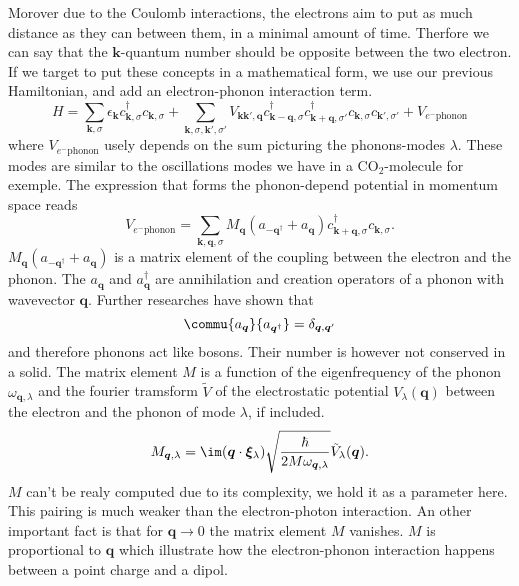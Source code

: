 \documentclass[../main.tex]{subfile}
\begin{document}
Morover due to the Coulomb interactions, the electrons aim to put as much distance as they can between them, in a minimal amount of time. Therfore
we can say that the $\bm{k}$-quantum number should be opposite between the two electron. If we target to put these concepts in a mathematical form, we use
our previous Hamiltonian, and add an electron-phonon interaction term.
\[
    H = \sum_{\bm{k},\sigma} \epsilon_{\bm{k}} c_{\bm{k},\sigma}^{\dagger}c_{\bm{k},\sigma} + \sum_{\bm{k},\sigma,\bm{k}',\sigma'}
        V_{\bm{k}\bm{k}', \bm{q}} c_{\bm{k}-\bm{q},\sigma}^{\dagger}c_{\bm{k}+\bm{q},\sigma'}^{\dagger}c_{\bm{k},\sigma}c_{\bm{k}',\sigma'} + V_{e^-\text{phonon}}
\]
where $V_{e^-\text{phonon}}$ usely depends on the sum picturing the phonons-modes $\lambda$. These modes are similar to the oscillations modes we have in a CO$_2$-molecule for exemple.
The expression that forms the phonon-depend potential in momentum space reads 
\begin{equation} \label{eq:Pot_phonon_interaction}
    V_{e^-\text{phonon}} = \sum_{\bm{k},\bm{q},\sigma} M_{\bm{q}}\left(a_{-\bm{q}^{\dagger}} + a_{\bm{q}}\right) c_{\bm{k}+\bm{q},\sigma}^{\dagger}c_{\bm{k},\sigma}.
\end{equation}
$M_{\bm{q}}\left(a_{-\bm{q}^{\dagger}} + a_{\bm{q}}\right) $ is a matrix element of the coupling between the electron and the phonon. 
The $a_{\bm{q}}$ and $a_{\bm{q}}^{\dagger}$ are annihilation and creation operators of a phonon with wavevector $\bm{q}$. Further researches have shown that \cite{Folk2014} 
\[
    \commu{a_{\bm{q}}}{a_{\bm{q}^{\dagger}}} = \delta_{\bm{q},\bm{q}'}
\] 
and therefore phonons act like bosons. Their number is however not conserved in a solid. The matrix element $M$ is a function of the eigenfrequency 
of the phonon $\omega_{\bm{q},\lambda}$ and the fourier tramsform $\tilde{V}$ of the electrostatic potential $V_{\lambda}(\bm{q})$ between the electron
and the phonon of mode $\lambda$, if included.
\[
    M_{\bm{q},\lambda} = \im (\bm{q}\cdot \bm{\xi}_{\lambda}) \sqrt{\frac{\hbar}{2M\omega_{\bm{q},\lambda}}} \tilde{V}_{\lambda}(\bm{q}).
\]
$M$ can't be realy computed due to its complexity, we hold it as a parameter here. This pairing is much weaker than the electron-photon interaction. 
An other important fact is that for $\bm{q}\rightarrow 0$ the matrix element $M$ vanishes. $M$ is proportional to $\bm{q}$ which illustrate how the electron-phonon interaction
happens between a point charge and a dipol.\\
\end{document}
